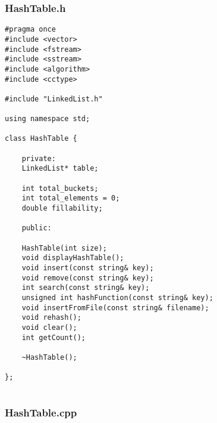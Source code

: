 \documentclass[11pt,a4paper,final]{article} %
\begin{document}
\subsubsection*{HashTable.h}
\begin{lstlisting}
#pragma once
#include <vector>
#include <fstream> 
#include <sstream>
#include <algorithm>
#include <cctype>

#include "LinkedList.h"

using namespace std;

class HashTable {
	
	private: 
	LinkedList* table;
	
	int total_buckets;
	int total_elements = 0;
	double fillability;
	
	public:
	
	HashTable(int size);
	void displayHashTable();
	void insert(const string& key);
	void remove(const string& key);
	int search(const string& key);
	unsigned int hashFunction(const string& key);
	void insertFromFile(const string& filename);
	void rehash();
	void clear();
	int getCount();
	
	~HashTable();
	
};
	
\end{lstlisting}
\subsubsection*{HashTable.cpp}
\end{document}
